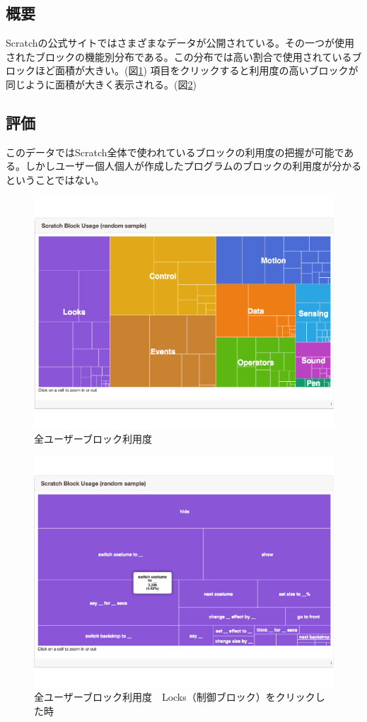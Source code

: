 \documentclass[a4paper,10pt,onecolumn,oneside,openany]{jsbook}
\begin{document}
\subsection{概要}
Scratchの公式サイトではさまざまなデータが公開されている。その一つが使用されたブロックの機能別分布である。この分布では高い割合で使用されているブロックほど面積が大きい。(図\ref{blockan})
 項目をクリックすると利用度の高いブロックが同じように面積が大きく表示される。(図\ref{blockdit}) 
 \subsection{評価}
 このデータではScratch全体で使われているブロックの利用度の把握が可能である。しかしユーザー個人個人が作成したプログラムのブロックの利用度が分かるということではない。
 
\begin{figure}[ht]
  \centering
    \includegraphics[scale=0.5]{graphic/scratch_block0.pdf}
  \caption{全ユーザーブロック利用度}
  \label{blockan}
 \end{figure}
 
 \begin{figure}[ht]
  \centering
    \includegraphics[scale=0.5]{graphic/scratch_block.pdf}
  \caption{全ユーザーブロック利用度　Locks（制御ブロック）をクリックした時}
  \label{blockdit}
 \end{figure}
 
\end{document}
